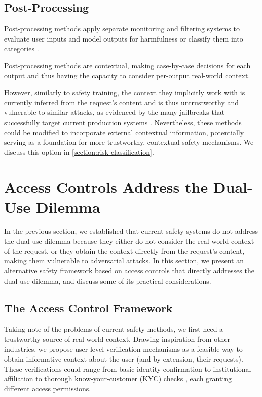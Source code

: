 \documentclass{article}
\theoremstyle{plain}
\theoremstyle{definition}
\theoremstyle{remark}
\begin{document}
\subsection{Post-Processing}

Post-processing methods apply separate monitoring and filtering
systems to evaluate user inputs and model outputs for harmfulness
\cite{inan2023llamaguardllmbasedinputoutput,
sharma2025constitutionalclassifiersdefendinguniversal} or classify
them into categories \cite{handa2025economictasksperformedai}.

Post-processing methods are contextual, making case-by-case decisions
for each output and thus having the capacity to consider per-output
real-world context.

However, similarly to safety training, the context they implicitly
work with is currently inferred from the request's content and is
thus untrustworthy and vulnerable to similar attacks, as evidenced by
the many jailbreaks that successfully target current production
systems \cite{zhang2025outputconstraintsattacksurface}. Nevertheless,
these methods could be modified to incorporate external contextual
information, potentially serving as a foundation for more
trustworthy, contextual safety mechanisms. We discuss this option in
\cref{section:risk-classification}.

\section{Access Controls Address the Dual-Use Dilemma}
\label{section:access-controls}

In the previous section, we established that current safety systems
do not address the dual-use dilemma because they either do not
consider the real-world context of the request, or they obtain the
context directly from the request's content, making them vulnerable
to adversarial attacks. In this section, we present an alternative
safety framework based on access controls that directly addresses the
dual-use dilemma, and discuss some of its practical considerations.

\subsection{The Access Control Framework}

Taking note of the problems of current safety methods, we first need
a trustworthy source of real-world context. Drawing inspiration from
other industries, we propose user-level verification mechanisms as a
feasible way to obtain informative context about the user (and by
extension, their requests). These verifications could range from
basic identity confirmation to institutional affiliation to thorough
know-your-customer (KYC) checks \cite{FATF2025}, each granting
different access permissions.
\end{document}

